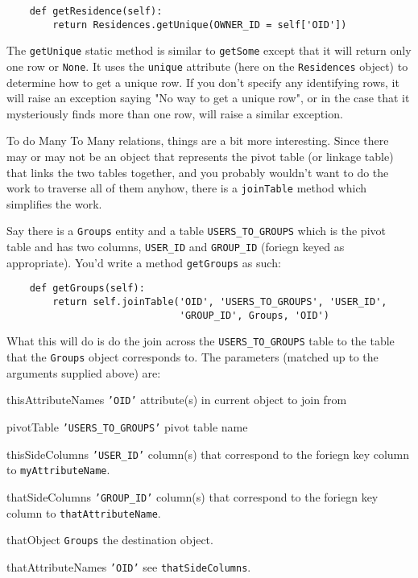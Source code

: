 \documentclass[titlepage]{manual}
\begin{document}
\begin{verbatim}
    def getResidence(self):
        return Residences.getUnique(OWNER_ID = self['OID'])
\end{verbatim}

The \texttt{getUnique} static method is similar to \texttt{getSome}
except that it will return only one row or \texttt{None}.  It uses the
\texttt{unique} attribute (here on the \texttt{Residences} object) to
determine how to get a unique row.  If you don't specify any
identifying rows, it will raise an exception saying "No way to get a
unique row", or in the case that it mysteriously finds more than one
row, will raise a similar exception.

To do Many To Many relations, things are a bit more interesting.
Since there may or may not be an object that represents the pivot
table (or linkage table) that links the two tables together, and you
probably wouldn't want to do the work to traverse all of them anyhow,
there is a \texttt{joinTable} method which simplifies the work.

Say there is a \texttt{Groups} entity and a table
\texttt{USERS_TO_GROUPS} which is the pivot table and has two columns,
\texttt{USER_ID} and \texttt{GROUP_ID} (foriegn keyed as appropriate).
You'd write a method \texttt{getGroups} as such:
\begin{verbatim}
    def getGroups(self):
        return self.joinTable('OID', 'USERS_TO_GROUPS', 'USER_ID',
                              'GROUP_ID', Groups, 'OID')
\end{verbatim}

What this will do is do the join across the \texttt{USERS_TO_GROUPS}
table to the table that the \texttt{Groups} object corresponds to.
The parameters (matched up to the arguments supplied above) are:

\begin{argdesc}
\item[thisAttributeNames]  \texttt{'OID'} attribute(s) in current object to join from
\item[pivotTable] \texttt{'USERS_TO_GROUPS'} pivot table name
\item[thisSideColumns] \texttt{'USER_ID'} column(s) that correspond to
the foriegn key column to \texttt{myAttributeName}.
\item[thatSideColumns] \texttt{'GROUP_ID'} column(s) that correspond
to the foriegn key column to \texttt{thatAttributeName}.
\item[thatObject] \texttt{Groups} the destination object.
\item[thatAttributeNames] \texttt{'OID'} see \texttt{thatSideColumns}.
\end{argdesc}
\end{document}
